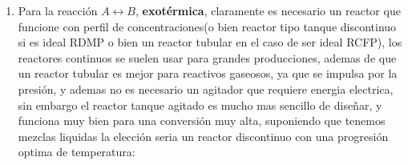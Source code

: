 \begin{enumerate}[label={\alph*)}]
\begin{multicols}{2}
		      \begin{equation*}
			      \left\{
			      \begin{aligned}
				      \frac{dC_A}{dt} & = \frac{F}{V}\cdot (C_{A0}-C_A) - r_A \\[6pt]
				      \frac{dC_B}{dt} & = -\frac{F C_B}{V} - r_B              \\[6pt]
				      \frac{dC_P}{dt} & = -\frac{F C_P}{V} + r_P              \\[6pt]
				      \frac{dC_Q}{dt} & = -\frac{F C_Q}{V} + r_Q
			      \end{aligned}
			      \right.
		      \end{equation*}

		      \columnbreak

		      \begin{equation*}
			      \left\{
			      \begin{aligned}
				      C_A             & = \frac{N_A}{V}                                \\[6pt]
				      C_B             & = \frac{N_B}{V}                                \\[6pt]
				      C_P             & = \frac{N_P}{V}                                \\[6pt]
				      C_Q             & = \frac{N_Q}{V}                                \\[6pt]
				      dN_i            & = d(V \cdot C_i) = V \cdot dC_i + C_i \cdot dV \\[6pt]
				      \frac{dN_i}{dt} & = V \cdot \frac{dC_i}{dt} + C_i \frac{dV}{dt}  \\[6pt]
				      \frac{dV}{dt}   & = F
			      \end{aligned}
			      \right.
		      \end{equation*}
	      \end{multicols}
	\item Para la reacción $A \leftrightarrow B$, \textbf{exotérmica}, claramente es necesario un reactor que funcione con perfil de concentraciones(o bien reactor tipo tanque discontinuo si es ideal RDMP o bien un reactor tubular en el caso de ser ideal RCFP), los reactores continuos se suelen usar para grandes producciones, ademas de que un reactor tubular es mejor para reactivos gaseosos,
	      ya que se impulsa por la presión, y ademas no es necesario un agitador que requiere energia electrica, sin embargo el reactor tanque agitado es mucho mas sencillo de diseñar, y funciona muy bien para una conversión muy alta, suponiendo que tenemos mezclas liquidas la elección seria un reactor discontinuo con una progresión optima de temperatura:\\

\end{enumerate}
